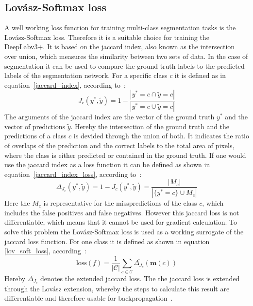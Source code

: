 \subsection{Lovász-Softmax loss}
A well working loss function for training multi-class segmentation tasks is the Lovász-Softmax loss.
Therefore it is a suitable choice for training the DeepLabv3+.
It is based on the jaccard index, also known as the intersection over union, which measures the similarity between two sets of data.
In the case of segmentation it can be used to compare the ground truth labels to the predicted labels of the segmentation network.
For a specific class $c$ it is defined as in equation~\ref{jaccard_index}, according to~\cite{Berman2017}:
\begin{equation}
    J_c(y^* , \tilde{y}) = 1 - \frac{|{y^* = c} \cap {\tilde{y} = c}|}{|{y^* = c} \cup {\tilde{y} = c}|}
    \label{jaccard_index}
\end{equation}
The arguments of the jaccard index are the vector of the ground truth $y^*$ and the vector of predictions $\tilde{y}$.
Hereby the intersection of the ground truth and the predictions of a class $c$ is devided through the union of both.
It indicates the ratio of overlaps of the prediction and the correct labels to the total area of pixels, where the class is either predicted or contained in the ground truth.
If one would use the jaccard index as a loss function it can be defined as shown in equation~\ref{jaccard_index_loss}, according to~\cite{Berman2017}:
\begin{equation}
    \Delta_{J_c}(y^*, \tilde{y}) = 1 - J_c(y^*,\tilde{y}) = \frac{|M_c|}{|\{y^* = c\} \cup M_c|}
    \label{jaccard_index_loss}
\end{equation}
Here the $M_c$ is representative for the misspredictions of the class $c$, which includes the false positives and false negatives.
However this jaccard loss is not differentiable, which means that it cannot be used for gradient calculation. 
To solve this problem the Lovász-Softmax loss is used as a working surrogate of the jaccard loss function.
For one class it is defined as shown in equation \ref{lov_soft_loss}, according~\cite{Berman2017}:
\begin{equation}
    \text{loss}(f) = \frac{1}{|\mathcal{C}|} \sum_{c\in \mathcal{C}} \overline{\Delta_{J_c}}(\mathbf{m}(c))
    \label{lov_soft_loss}
\end{equation}
Hereby $\overline{\Delta_{J_c}}$ denotes the extended jaccard loss.
The the jaccard loss is extended through the Lovász extension, whereby the steps to calculate this result are differentiable and therefore usable for backpropagation~\cite{Berman2017}.\\
